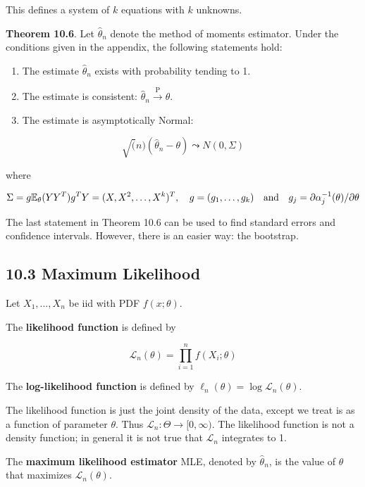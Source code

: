 This defines a system of \(k\) equations with \(k\) unknowns.

\textbf{Theorem 10.6}. Let \(\hat{\theta}_n\) denote the method of
moments estimator. Under the conditions given in the appendix, the
following statements hold:

\begin{enumerate}
\def\labelenumi{(\arabic{enumi})}
\item
  The estimate \(\hat{\theta}_n\) exists with probability tending to 1.
\item
  The estimate is consistent:
  \(\hat{\theta}_n \xrightarrow{\text{P}} \theta\).
\item
  The estimate is asymptotically Normal:
\end{enumerate}

\[\sqrt(n)(\hat{\theta}_n - \theta) \leadsto N(0, \Sigma) \]

where

\[
\Sigma = g \mathbb{E}_\theta (Y Y^T) g^T \\
Y = (X, X^2, \dots, X^k)^T, \quad g = (g_1, \dots, g_k) \quad \text{and} \quad g_j = \partial \alpha_j^{-1}(\theta)/\partial\theta
\]

The last statement in Theorem 10.6 can be used to find standard errors
and confidence intervals. However, there is an easier way: the
bootstrap.

\subsection{10.3 Maximum Likelihood}\label{maximum-likelihood}

Let \(X_1, \dots, X_n\) be iid with PDF \(f(x; \theta)\).

The \textbf{likelihood function} is defined by

\[ \mathcal{L}_n(\theta) = \prod_{i=1}^n f(X_i; \theta) \]

The \textbf{log-likelihood function} is defined by
\(\ell_n(\theta) = \log \mathcal{L}_n(\theta)\).

The likelihood function is just the joint density of the data, except we
treat is as a function of parameter \(\theta\). Thus
\(\mathcal{L}_n : \Theta \rightarrow [0, \infty)\). The likelihood
function is not a density function; in general it is not true that
\(\mathcal{L}_n\) integrates to 1.

The \textbf{maximum likelihood estimator} MLE, denoted by
\(\hat{\theta}_n\), is the value of \(\theta\) that maximizes
\(\mathcal{L}_n(\theta)\).

